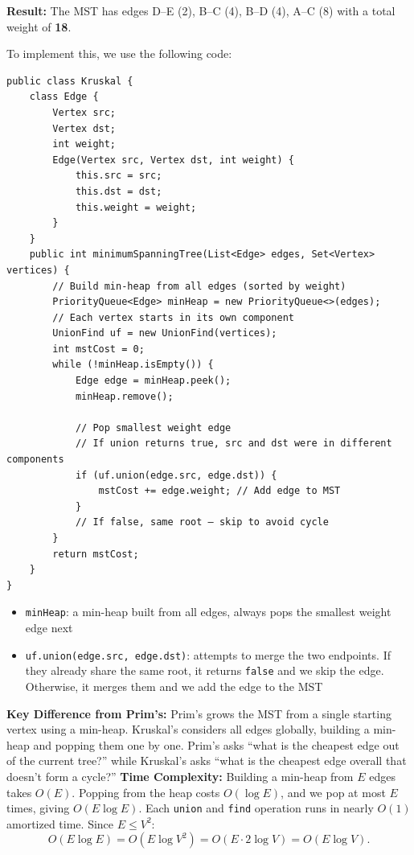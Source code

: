 \textbf{Result:} The MST has edges D--E (2), B--C (4), B--D (4), A--C (8) with a total weight of \textbf{18}.

To implement this, we use the following code:
\begin{verbatim}
public class Kruskal {
    class Edge {
        Vertex src;
        Vertex dst;
        int weight;
        Edge(Vertex src, Vertex dst, int weight) {
            this.src = src;
            this.dst = dst;
            this.weight = weight;
        }
    }
    public int minimumSpanningTree(List<Edge> edges, Set<Vertex> vertices) {
        // Build min-heap from all edges (sorted by weight)
        PriorityQueue<Edge> minHeap = new PriorityQueue<>(edges);
        // Each vertex starts in its own component
        UnionFind uf = new UnionFind(vertices); 
        int mstCost = 0;
        while (!minHeap.isEmpty()) {
            Edge edge = minHeap.peek();
            minHeap.remove();
            
            // Pop smallest weight edge
            // If union returns true, src and dst were in different components
            if (uf.union(edge.src, edge.dst)) {
                mstCost += edge.weight; // Add edge to MST
            }
            // If false, same root — skip to avoid cycle
        }
        return mstCost;
    }
}
\end{verbatim}

\begin{itemize}
  \item \texttt{minHeap}: a min-heap built from all edges, always pops the smallest weight edge next
  \item \texttt{uf.union(edge.src, edge.dst)}: attempts to merge the two endpoints. If they already share the same root, it returns \texttt{false} and we skip the edge. Otherwise, it merges them and we add the edge to the MST
\end{itemize}
\textbf{Key Difference from Prim's:} Prim's grows the MST from a single starting vertex using a min-heap. Kruskal's considers all edges globally, building a min-heap and popping them one by one. Prim's asks ``what is the cheapest edge out of the current tree?'' while Kruskal's asks ``what is the cheapest edge overall that doesn't form a cycle?''
\textbf{Time Complexity:}
Building a min-heap from $E$ edges takes $O(E)$. Popping from the heap costs $O(\log E)$, and we pop at most $E$ times, giving $O(E \log E)$. Each \texttt{union} and \texttt{find} operation runs in nearly $O(1)$ amortized time. Since $E \leq V^2$:
\[
O(E \log E) = O(E \log V^2) = O(E \cdot 2\log V) = O(E \log V).
\]

